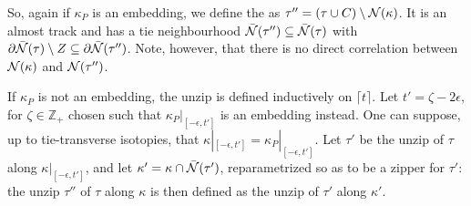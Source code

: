 \begin{defin}
So, again if $\kappa_P$ is an embedding, we define the  as $\tau''=(\tau\cup C)\setminus {\mathcal N}(\kappa)$. It is an almost track and has a tie neighbourhood $\bar{{\mathcal N}}(\tau'')\subseteq \bar{{\mathcal N}}(\tau)$ with $\partial\bar{{\mathcal N}}(\tau)\setminus Z\subseteq \partial\bar{{\mathcal N}}(\tau'')$. Note, however, that there is no direct correlation between ${\mathcal N}(\kappa)$ and ${\mathcal N}(\tau'')$.

If $\kappa_P$ is not an embedding, the unzip is defined inductively on $\lceil t\rceil$. Let $t'=\zeta-2\epsilon$, for $\zeta\in \mathbb Z_+$ chosen such that $\kappa_P|_{[-\epsilon,t']}$ is an embedding instead. One can suppose, up to tie-transverse isotopies, that $\kappa|_{[-\epsilon,t']}=\kappa_P|_{[-\epsilon,t']}$. Let $\tau'$ be the unzip of $\tau$ along $\kappa|_{[-\epsilon,t']}$, and let $\kappa'=\kappa\cap\bar{{\mathcal N}}(\tau')$, reparametrized so as to be a zipper for $\tau'$: the unzip $\tau''$ of $\tau$ along $\kappa$ is then defined as the unzip of $\tau'$ along $\kappa'$.
\end{defin}

